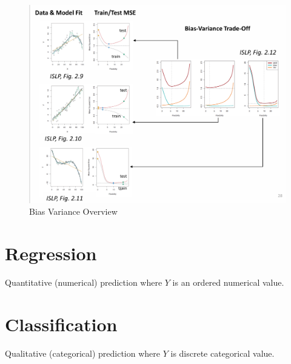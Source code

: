 \documentclass[../Main.tex]{subfiles}
\begin{document}
\begin{figure}[H]
    \centering
    \includegraphics[width=1\linewidth]{Images/bias-variance-tradeoff-overview.png}
    \caption{Bias Variance Overview}
    \label{fig:enter-label}
\end{figure}

\newpage
\section{Regression}
Quantitative (numerical) prediction where \(Y\) is an ordered numerical value. 

\section{Classification}
Qualitative (categorical) prediction where \(Y\) is discrete categorical value. 
\end{document}
